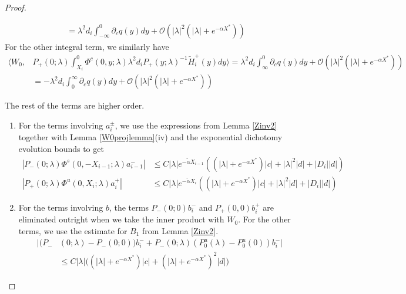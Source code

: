 \documentclass[thesis.tex]{subfiles}
\begin{document}
\begin{lemma}
\begin{proof}
\begin{enumerate}
\begin{align*}
&= \lambda^2 d_i \int_{-\infty}^0 \partial_c q(y)dy + \mathcal{O}(|\lambda|^2( |\lambda| + e^{-\alpha X^*})) 
\end{align*}
For the other integral term, we similarly have
\begin{align*}
\langle W_0, &P_+(0; \lambda) \int_{X_i}^0 \Phi^c(0, y; \lambda) \lambda^2 d_i P_+(y; \lambda)^{-1} \tilde{H}_i^+(y) dy \rangle = \lambda^2 d_i \int_{\infty}^0 \partial_c q(y)dy + \mathcal{O}(|\lambda|^2( |\lambda| + e^{-\alpha X^*})) \\
&= -\lambda^2 d_i \int_0^{\infty} \partial_c q(y)dy + \mathcal{O}(|\lambda|^2( |\lambda| + e^{-\alpha X^*}))
\end{align*}
\end{enumerate}

The rest of the terms are higher order.
\begin{enumerate}

\item For the terms involving $a_i^\pm$, we use the expressions from Lemma \ref{Zinv2} together with Lemma \ref{W0projlemma}(iv) and the exponential dichotomy evolution bounds to get
\begin{align*}
|P_-(0; \lambda) \Phi^s(0, -X_{i-1}; \lambda) a_{i-1}^-| &\leq C |\lambda| e^{-\tilde{\alpha} X_{i-1}} \left( (|\lambda| + e^{-\alpha X^*})|c| + |\lambda|^2 |d| + |D_i||d| \right) \\
|P_+(0; \lambda) \Phi^u(0, X_i; \lambda) a_i^+| &\leq C |\lambda| e^{-\tilde{\alpha} X_i}\left( (|\lambda| + e^{-\alpha X^*})|c| + |\lambda|^2 |d| + |D_i||d| \right) 
\end{align*} 

\item For the terms involving $b$, the terms $P_-(0; 0) b_i^-$ and $P_+(0, 0)b_i^+$ are eliminated outright when we take the inner product with $W_0$. For the other terms, we use the estimate for $B_1$ from Lemma \ref{Zinv2}.
\begin{align*}
|(P_-&(0; \lambda) - P_-(0; 0))b_i^- + P_-(0; \lambda)(P_0^u(\lambda) - P_0^u(0))b_i^-| \\
&\leq C |\lambda|\Big( (|\lambda| + e^{-\alpha X^*})|c| + (|\lambda| + e^{-\alpha X^*})^2 |d| \Big)
\end{align*}


\end{enumerate}
\end{proof}
\end{lemma}
\end{document}
